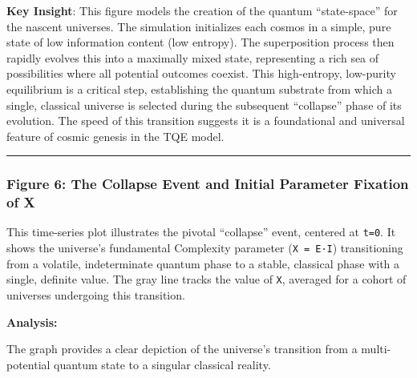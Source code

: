 \textbf{Key Insight}: This figure models the creation of the quantum
``state-space'' for the nascent universes. The simulation initializes
each cosmos in a simple, pure state of low information content (low
entropy). The superposition process then rapidly evolves this into a
maximally mixed state, representing a rich sea of possibilities where
all potential outcomes coexist. This high-entropy, low-purity
equilibrium is a critical step, establishing the quantum substrate from
which a single, classical universe is selected during the subsequent
``collapse'' phase of its evolution. The speed of this transition
suggests it is a foundational and universal feature of cosmic genesis in
the TQE model.

\begin{center}\rule{0.5\linewidth}{0.5pt}\end{center}

\subsubsection{Figure 6: The Collapse Event and Initial Parameter
Fixation of
X}\label{figure-6-the-collapse-event-and-initial-parameter-fixation-of-x}

This time-series plot illustrates the pivotal ``collapse'' event,
centered at \texttt{t=0}. It shows the universe's fundamental Complexity
parameter (\texttt{X\ =\ E·I}) transitioning from a volatile,
indeterminate quantum phase to a stable, classical phase with a single,
definite value. The gray line tracks the value of \texttt{X}, averaged
for a cohort of universes undergoing this transition.

\textbf{Analysis:}

The graph provides a clear depiction of the universe's transition from a
multi-potential quantum state to a singular classical reality.

